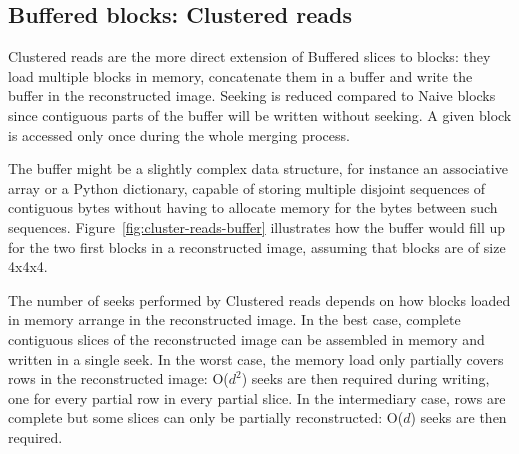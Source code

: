 \documentclass[10pt, conference, compsocconf]{IEEEtran}
\begin{document}
\subsection{Buffered blocks: Clustered reads}

Clustered reads are the more direct extension of Buffered slices to
blocks: they load multiple blocks in memory, concatenate them in a
buffer and write the buffer in the reconstructed image. Seeking is
reduced compared to Naive blocks since contiguous parts of the
buffer will be written without seeking. A given
block is accessed only once during the whole merging process.

The buffer might be a slightly complex data structure, for instance an
associative array or a Python dictionary, capable of storing multiple
disjoint sequences of contiguous bytes without having to allocate
memory for the bytes between such
sequences. Figure~\ref{fig:cluster-reads-buffer} illustrates how the
buffer would fill up for the two first blocks in a reconstructed
image, assuming that blocks are of size 4x4x4.

The number of seeks performed by Clustered reads depends on how blocks
loaded in memory arrange in the reconstructed image. In the best case,
complete contiguous slices of the reconstructed image can be assembled
in memory and written in a single seek. In the worst case, the
memory load only partially covers rows in the reconstructed image:
O($d^2$) seeks are then required during writing, one for every partial
row in every partial slice. In the intermediary case, rows are
complete but some slices can only be partially reconstructed: O($d$)
seeks are then required.
\end{document}
